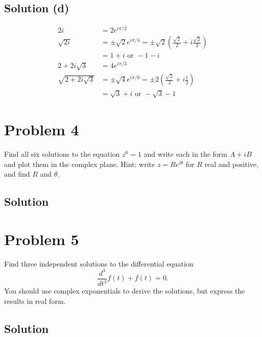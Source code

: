 \documentclass[12pt]{article}
\begin{document}
\subsection{Solution (d)}
\begin{align}
    2i  &=  2e^{i\pi/2}\\
    \sqrt{2i}   &=  \pm \sqrt{2} e^{i\pi/4}
        =   \pm \sqrt{2} \left(\frac{\sqrt{2}}{2} + i\frac{\sqrt{2}}{2}\right)\\
        &=  \boxed{1 + i \text{ or } -1 - i}\\
    2 + 2i\sqrt{3}  &=  4e^{i\pi/3}\\
    \sqrt{2 + 2i\sqrt{3}}   &=  \pm \sqrt{4} e^{i\pi/6}
        =   \pm 2 \left(\frac{\sqrt{3}}{2} + i\frac{1}{2}\right)\\
        &=  \boxed{\sqrt{3} + i \text{ or } -\sqrt{3} - 1}
\end{align}


\pagebreak
\section{Problem 4}
Find all six solutions to the equation $z^6 = 1$ and write each in the form $A + iB$ and plot them in the complex plane. Hint: write $z = Re^{i\theta}$ for $R$ real and positive, and ﬁnd $R$ and $\theta$.


\subsection*{Solution}


\pagebreak
\section{Problem 5}
Find three independent solutions to the differential equation
\[ \frac{d^3}{dt^3} f(t) + f(t) = 0. \]
You should use complex exponentials to derive the solutions, but express the results in real
form.


\subsection*{Solution}
\end{document}
